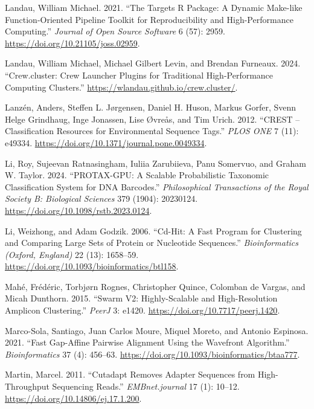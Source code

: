 \documentclass[
]{article}
\newlength{\cslhangindent}
\newenvironment{CSLReferences}[2] %
 {\begin{list}{}{%
  \setlength{\itemindent}{0pt}
  \setlength{\leftmargin}{0pt}
  \setlength{\parsep}{0pt}
  \ifodd #1
   \setlength{\leftmargin}{\cslhangindent}
   \setlength{\itemindent}{-1\cslhangindent}
  \fi
  \setlength{\itemsep}{#2\baselineskip}}}
 {\end{list}}
\begin{document}
\begin{CSLReferences}{1}{0}
Landau, William Michael. 2021. {``The Targets {R} Package: A Dynamic {Make-like} Function-Oriented Pipeline Toolkit for Reproducibility and High-Performance Computing.''} \emph{Journal of Open Source Software} 6 (57): 2959. \url{https://doi.org/10.21105/joss.02959}.

Landau, William Michael, Michael Gilbert Levin, and Brendan Furneaux. 2024. {``Crew.cluster: {Crew} Launcher Plugins for Traditional High-Performance Computing Clusters.''} \url{https://wlandau.github.io/crew.cluster/}.

Lanzén, Anders, Steffen L. Jørgensen, Daniel H. Huson, Markus Gorfer, Svenn Helge Grindhaug, Inge Jonassen, Lise Øvreås, and Tim Urich. 2012. {``{CREST} -- {Classification Resources} for {Environmental Sequence Tags}.''} \emph{PLOS ONE} 7 (11): e49334. \url{https://doi.org/10.1371/journal.pone.0049334}.

Li, Roy, Sujeevan Ratnasingham, Iuliia Zarubiieva, Panu Somervuo, and Graham W. Taylor. 2024. {``{PROTAX-GPU}: A Scalable Probabilistic Taxonomic Classification System for {DNA} Barcodes.''} \emph{Philosophical Transactions of the Royal Society B: Biological Sciences} 379 (1904): 20230124. \url{https://doi.org/10.1098/rstb.2023.0124}.

Li, Weizhong, and Adam Godzik. 2006. {``Cd-Hit: A Fast Program for Clustering and Comparing Large Sets of Protein or Nucleotide Sequences.''} \emph{Bioinformatics (Oxford, England)} 22 (13): 1658--59. \url{https://doi.org/10.1093/bioinformatics/btl158}.

Mahé, Frédéric, Torbjørn Rognes, Christopher Quince, Colomban de Vargas, and Micah Dunthorn. 2015. {``Swarm V2: Highly-Scalable and High-Resolution Amplicon Clustering.''} \emph{PeerJ} 3: e1420. \url{https://doi.org/10.7717/peerj.1420}.

Marco-Sola, Santiago, Juan Carlos Moure, Miquel Moreto, and Antonio Espinosa. 2021. {``Fast Gap-Affine Pairwise Alignment Using the Wavefront Algorithm.''} \emph{Bioinformatics} 37 (4): 456--63. \url{https://doi.org/10.1093/bioinformatics/btaa777}.

Martin, Marcel. 2011. {``Cutadapt Removes Adapter Sequences from High-Throughput Sequencing Reads.''} \emph{EMBnet.journal} 17 (1): 10--12. \url{https://doi.org/10.14806/ej.17.1.200}.


\end{CSLReferences}
\end{document}

